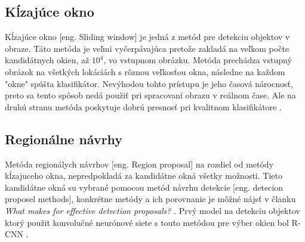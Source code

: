 \begin{comment}
    \subsubsection{Vyhľadávač na základe vizuálnej podobnosti obrázkov}
    Jednu z možných aplikácií detekcie objektou v obraze využíva Pinterest\footnote{\url{https://medium.com/@Pinterest_Engineering/introducing-automatic-object-detection-to-visual-search-e57c29191c30}}.
    Používaju detekciu objektou pre indexovanie rôznych častí obrázka.
    Týmto spôsobom si môže užívateľ pri hľadaní npr. špecifickej kabelky alebo topánok nájsť aj jej podobné.
    \begin{figure}[H]
        \centering
        \texttt{[image: purse]}
        \caption{Prototyp automatického označovania a vyhľadávania objektov\cite{odkaz:ObjectDetectionOverview}}
        \label{pic:kNN}
    \end{figure}    
\end{comment}

\subsection{Kĺzajúce okno}
\label{subsec:slidingwindow}
Kĺzajúce okno [eng. Sliding window] je jedná z metód pre detekciu objektov v obraze.
Táto metóda je veľmi vyčerpávajúca pretože zakladá na veľkom počte kandidátnych okien, až $10^4$, vo vstupnom obrázku.
Metóda prechádza vstupný obrázok na všetkých lokáciách s rôznou veľkosťou okna, následne na každom "okne" spúšta klasifikátor.
Nevýhodou tohto prístupu je jeho časová nárocnosť, preto sa tento spôsob nedá použiť pri spracovaní obrazu v reálnom čase.
Ale na druhú stranu metóda poskytuje dobrú presnosť pri kvalitnom klasifikátore \cite{prop:AutomaticHandgunDetection}.

\subsection{Regionálne návrhy}
\label{subsec:regionproposal}
Metóda regionálych návrhov [eng. Region proposal] na rozdiel od metódy kĺzajuceho okna, nepredpokladá za kandidátne okná všetky možnosti.
Tieto kandidátne okná su vybrané pomocou metód návrhu detekcie [eng. detecion proposel methods], konkrétne metódy
    a ich porovnanie je môžné nájsť v članku \textit{What makes for effective detection proposals?} \cite{prop:ProposalMethods}.
Prvý model na detekciu objektov ktorý použit konvolučné neurónové siete s touto metódou pre výber okien bol R-CNN \cite{prop:AutomaticHandgunDetection}.
